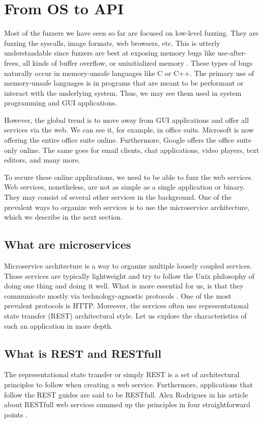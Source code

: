\chapter{From OS to API}
Most of the fuzzers we have seen so far are focused on low-level fuzzing. They are fuzzing the syscalls, image formats, web browsers, etc. This is utterly understandable since fuzzers are best at exposing memory bugs like use-after-frees, all kinds of buffer overflow, or uninitialized memory \cite{chang2017oss}. These types of bugs naturally occur in memory-unsafe languages like C or C++. The primary use of memory-unsafe languages is in programs that are meant to be performant or interact with the underlying system. Thus, we may see them used in system programming and GUI applications.

However, the global trend is to move away from GUI applications and offer all services via the web. We can see it, for example, in office suits. Microsoft is now offering the entire office suite online. Furthermore, Google offers the office suite only online. The same goes for email clients, chat applications, video players, text editors, and many more.

To secure these online applications, we need to be able to fuzz the web services. Web services, nonetheless, are not as simple as a single application or binary. They may consist of several other services in the background. One of the prevalent ways to organize web services is to use the microservice architecture, which we describe in the next section.

\section{What are microservices}
Microservice architecture is a way to organize multiple loosely coupled services. Those services are typically lightweight and try to follow the Unix philosophy of doing one thing and doing it well. What is more essential for us, is that they communicate mostly via technology-agnostic protocols \cite{nadareishvili2016microservice}. One of the most prevalent protocols is HTTP. Moreover, the services often use representational state transfer (REST) architectural style. Let us explore the characteristics of such an application in more depth.

\section{What is REST and RESTfull}
The representational state transfer or simply REST is a set of architectural principles to follow when creating a web service. Furthermore, applications that follow the REST guides are said to be RESTfull. Alex Rodrigues in his article about RESTfull web services summed up the principles in four straightforward points \cite{rodriguez2008restful}.

